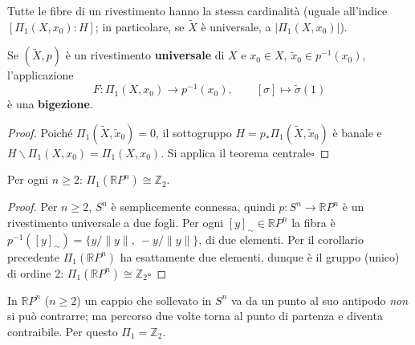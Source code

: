 \begin{coro}
Tutte le fibre di un rivestimento hanno la stessa cardinalit\`a (uguale all'indice $[\Pi_1(X,x_0) : H]$; in particolare, se $\widetilde{X}$ \`e universale, a $|\Pi_1(X, x_0)|$).
\end{coro}


\begin{coro}
Se $(\widetilde{X}, p)$ \`e un rivestimento \textbf{universale} di $X$ e $x_0 \in X$, $\widetilde{x}_0 \in p^{-1}(x_0)$, l'applicazione
\[
F: \Pi_1(X, x_0) \longrightarrow p^{-1}(x_0), \qquad [\sigma] \longmapsto \widetilde{\sigma}(1)
\]
\`e una \textbf{bigezione}.
\end{coro}
\begin{proof}
Poich\'e $\Pi_1(\widetilde{X}, \widetilde{x}_0) = 0$, il sottogruppo $H = p_*\Pi_1(\widetilde{X}, \widetilde{x}_0)$ \`e banale e $H \backslash \Pi_1(X, x_0) = \Pi_1(X, x_0)$. Si applica il teorema centrale\hfill$\square$
\end{proof}

\begin{prop}
Per ogni $n \geqslant 2$: $\Pi_1(\mathbb{R}P^n) \cong \mathbb{Z}_2$.
\end{prop}
\begin{proof}
Per $n \geqslant 2$, $S^n$ \`e semplicemente connessa, quindi $p: S^n \to \mathbb{R}P^n$ \`e un rivestimento universale a due fogli. Per ogni $[y]_\sim \in \mathbb{R}P^n$ la fibra \`e $p^{-1}([y]_\sim) = \{ y/\|y\|,\ -y/\|y\| \}$, di due elementi. Per il corollario precedente $\Pi_1(\mathbb{R}P^n)$ ha esattamente due elementi, dunque \`e il gruppo (unico) di ordine $2$: $\Pi_1(\mathbb{R}P^n) \cong \mathbb{Z}_2$\hfill$\square$
\end{proof}

\begin{intuizione}
In $\mathbb{R}P^n$ ($n \geqslant 2$) un cappio che sollevato in $S^n$ va da un punto al suo antipodo \emph{non} si pu\`o contrarre; ma percorso due volte torna al punto di partenza e diventa contraibile. Per questo $\Pi_1 = \mathbb{Z}_2$.
\end{intuizione}

